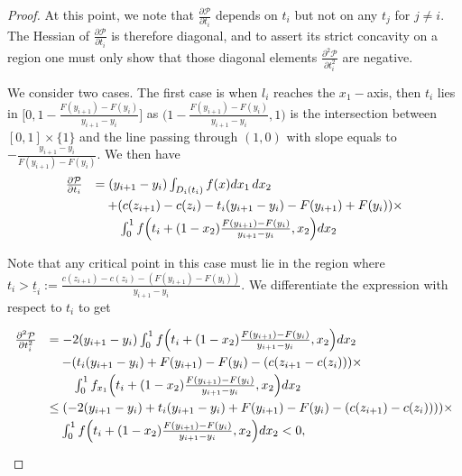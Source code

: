 \documentclass[12pt,reqno]{amsart}
\begin{document}
\begin{proof}
 At this point, we note that $\frac{\partial\mathcal{P}}{\partial t_i}$ depends on $t_i$ but not on any $t_j$ for $j \neq i$.  The Hessian of $\frac{\partial\mathcal{P}}{\partial t_i}$ is therefore diagonal, and to assert its strict concavity on a region one must only show that those diagonal elements $\frac{\partial^2\mathcal{P}}{\partial t_i^2}$ are negative. 


We consider two cases. The first case is when $l_i$ reaches the $x_1-$axis, then $t_i$ lies in $\Big[0,1-\frac{F(y_{i+1})-F(y_i)}{y_{i+1}-y_i}\Big]$ as $\Big(1-\frac{F(y_{i+1})-F(y_i)}{y_{i+1}-y_i},1\Big)$ is the intersection between $[0,1]\times\{1\}$ and the line passing through $(1,0)$ with slope equals to $-\frac{y_{i+1}-y_i}{F(y_{i+1})-F(y_i)}.$ We then have
\[\begin{array}{ll}
\frac{\partial\mathcal{P}}{\partial t_i}&=(y_{i+1}-y_i)\int_{D_i(t_i)}f(x)dx_1\,dx_2\vspace{3pt}\\
&\quad +(c(z_{i+1})-c(z_i)-t_i(y_{i+1}-y_i)-F(y_{i+1})+F(y_i))\times \vspace{3pt}\\
&\quad\quad\int_0^1 f\Big(t_i+(1-x_2)\frac{F(y_{i+1})-F(y_{i})}{y_{i+1}-y_{i}},x_2\Big)dx_2
\end{array}\]

Note that any critical point in this case must lie in the region where $ t_i>\underline{t}_i:=\frac{c(z_{i+1})-c(z_i)-(F(y_{i+1})-F(y_i))}{y_{i+1}-y_i}$.
We differentiate the expression with respect to $t_i$ to get

\[\begin{array}{ll}
\frac{\partial^2\mathcal{P}}{\partial t_i^2}&=-2(y_{i+1}-y_i)\int_0^1 f\Big(t_i+(1-x_2)\frac{F(y_{i+1})-F(y_{i})}{y_{i+1}-y_{i}},x_2\Big)dx_2\vspace{3pt}\\
&\quad-(t_i(y_{i+1}-y_i)+F(y_{i+1})-F(y_i)-(c(z_{i+1}-c(z_i)))\times\vspace{3pt}\\
&\quad\quad\int_0^1 f_{x_1}\Big(t_i+(1-x_2)\frac{F(y_{i+1})-F(y_{i})}{y_{i+1}-y_{i}},x_2\Big)dx_2\vspace{3pt}\\
&\le(-2(y_{i+1}-y_i)+t_i(y_{i+1}-y_i)+F(y_{i+1})-F(y_i)-(c(z_{i+1})-c(z_i))))\times \vspace{3pt}\\
&\quad\int_0^1 f\Big(t_i+(1-x_2)\frac{F(y_{i+1})-F(y_{i})}{y_{i+1}-y_{i}},x_2\Big)dx_2<0,\vspace{3pt}\\


\end{array}\]
\end{proof}
\end{document}
